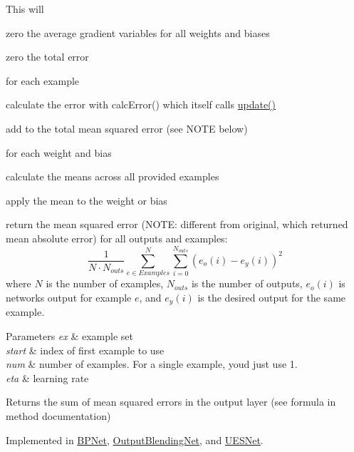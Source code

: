 This will
\begin{DoxyItemize}
\item zero the average gradient variables for all weights and biases
\item zero the total error
\item for each example
\begin{DoxyItemize}
\item calculate the error with calc\+Error() which itself calls \hyperlink{classNet_ad02198e219d3ba060c88d764ce54b905}{update()}
\item add to the total mean squared error (see N\+O\+TE below)
\end{DoxyItemize}
\item for each weight and bias
\begin{DoxyItemize}
\item calculate the means across all provided examples
\item apply the mean to the weight or bias
\end{DoxyItemize}
\item return the mean squared error (N\+O\+TE\+: different from original, which returned mean absolute error) for all outputs and examples\+: \[ \frac{1}{N\cdot N_{outs}}\sum^N_{e \in Examples} \sum_{i=0}^{N_{outs}} (e_o(i) - e_y(i))^2 \] where $N$ is the number of examples, $N_{outs}$ is the number of outputs, $e_o(i)$ is network\textquotesingle{}s output for example $e$, and $e_y(i)$ is the desired output for the same example. 
\begin{DoxyParams}{Parameters}
{\em ex} & example set \\
\hline
{\em start} & index of first example to use \\
\hline
{\em num} & number of examples. For a single example, you\textquotesingle{}d just use 1. \\
\hline
{\em eta} & learning rate \\
\hline
\end{DoxyParams}
\begin{DoxyReturn}{Returns}
the sum of mean squared errors in the output layer (see formula in method documentation) 
\end{DoxyReturn}

\end{DoxyItemize}

Implemented in \hyperlink{classBPNet_a3f820464f3338ed7305e9de950cd2103}{B\+P\+Net}, \hyperlink{classOutputBlendingNet_a4c65f752aeedb75c230773965d35df3b}{Output\+Blending\+Net}, and \hyperlink{classUESNet_ac27da7319d8be1507ea80506e69437e5}{U\+E\+S\+Net}.

